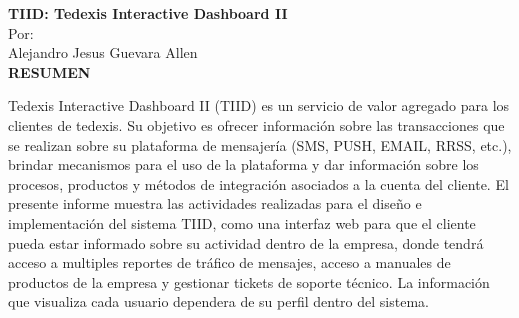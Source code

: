 \setcounter{page}{4}
\begin{center}

{\bfseries TIID: Tedexis Interactive Dashboard II\\}
\bigskip
Por: \\ Alejandro Jesus Guevara Allen\\
\bigskip
\bigskip
{\bf RESUMEN}  %
\end{center}	

Tedexis Interactive Dashboard II (TIID) es un servicio de valor agregado para los clientes de tedexis. Su objetivo es ofrecer información sobre las transacciones que se realizan sobre su plataforma de mensajería (SMS, PUSH, EMAIL, RRSS, etc.), brindar mecanismos para el uso de la plataforma y dar información sobre los procesos, productos y métodos de integración asociados a la cuenta del cliente.
\newline
\newline
\indent El presente informe muestra las actividades realizadas para el
diseño e implementación del sistema TIID, como una interfaz web para que el cliente pueda estar informado sobre su actividad dentro de la empresa, donde tendrá acceso a multiples reportes de tráfico de mensajes, acceso a manuales de productos de la empresa y gestionar tickets de soporte técnico. La información que visualiza cada usuario dependera de su perfil dentro del sistema.
\
\
\


